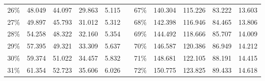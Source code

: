 \documentclass[12pt]{article}
\begin{document}
\begin{center}
\begin{tabular}{|c|r|r|r|r|r|c|r|r|r|r|}
    26\%                      & 48.049                             & 44.097                              & 29.863                              & 5.115                              &                                & 67\%                      & 140.304                            & 115.226                             & 83.222                              & 13.603                             \\ \cline{1-5} \cline{7-11} 
    27\%                      & 49.897                             & 45.793                              & 31.012                              & 5.312                              &                                & 68\%                      & 142.398                            & 116.946                             & 84.465                              & 13.806                             \\ \cline{1-5} \cline{7-11} 
    28\%                      & 54.258                             & 48.322                              & 32.160                              & 5.354                              &                                & 69\%                      & 144.492                            & 118.666                             & 85.707                              & 14.009                             \\ \cline{1-5} \cline{7-11} 
    29\%                      & 57.395                             & 49.321                              & 33.309                              & 5.637                              &                                & 70\%                      & 146.587                            & 120.386                             & 86.949                              & 14.212                             \\ \cline{1-5} \cline{7-11} 
    30\%                      & 59.374                             & 51.022                              & 34.457                              & 5.832                              &                                & 71\%                      & 148.681                            & 122.105                             & 88.191                              & 14.415                             \\ \cline{1-5} \cline{7-11} 
    31\%                      & 61.354                             & 52.723                              & 35.606                              & 6.026                              &                                & 72\%                      & 150.775                            & 123.825                             & 89.433                              & 14.618                             \\ \cline{1-5} \cline{7-11} 

\end{tabular}
\end{center}
\end{document}
